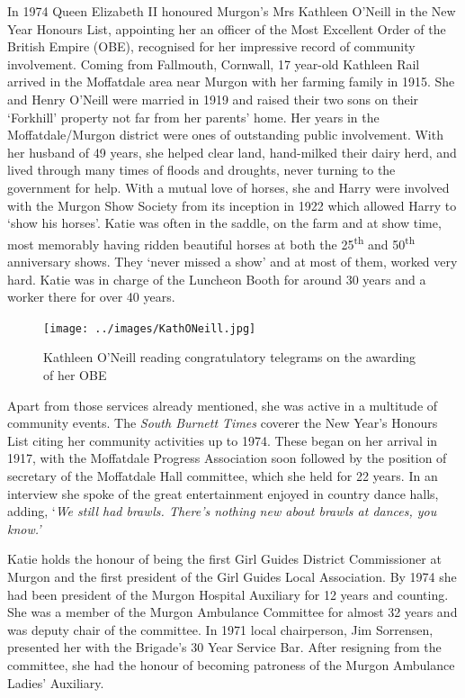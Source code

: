 In 1974 Queen Elizabeth II honoured Murgon's Mrs Kathleen O'Neill in the New Year Honours List, appointing her an officer of the Most Excellent Order of the British Empire (OBE), recognised for her impressive record of community involvement. Coming from Fallmouth, Cornwall, 17 year-old Kathleen Rail arrived in the Moffatdale area near Murgon with her farming family in 1915. She and Henry O'Neill were married in 1919 and raised their two sons on their `Forkhill' property not far from her parents' home. Her years in the Moffatdale/Murgon district were ones of outstanding public involvement. With her husband of 49 years, she helped clear land, hand-milked their dairy herd, and lived through many times of floods and droughts, never turning to the government for help. With a mutual love of horses, she and Harry were involved with the Murgon Show Society from its inception in 1922 which allowed Harry to `show his horses'. Katie was often in the saddle, on the farm and at show time, most memorably having ridden beautiful horses at both the 25\textsuperscript{th} and 50\textsuperscript{th} anniversary shows. They `never missed a show' and at most of them, worked very hard. Katie was in charge of the Luncheon Booth for around 30 years and a worker there for over 40 years.









\begin{figure}
\begin{center}
\texttt{[image: ../images/KathONeill.jpg]}
\caption{Kathleen O'Neill reading congratulatory telegrams on the awarding of her OBE}
\end{center}
\end{figure}




Apart from those services already mentioned, she was active in a multitude of community events. The \emph{South Burnett Times} coverer the New Year's Honours List citing her community activities up to 1974. These began on her arrival in 1917, with the Moffatdale Progress Association soon followed by the position of secretary of the Moffatdale Hall committee, which she held for 22 years. In an interview she spoke of the great entertainment enjoyed in country dance halls, adding, `\emph{We still had brawls. There's nothing new about brawls at dances, you know.'}



Katie holds the honour of being the first Girl Guides District Commissioner at Murgon and the first president of the Girl Guides Local Association. By 1974 she had been president of the Murgon Hospital Auxiliary for 12 years and counting. She was a member of the Murgon Ambulance Committee for almost 32 years and was deputy chair of the committee. In 1971 local chairperson, Jim Sorrensen, presented her with the Brigade's 30 Year Service Bar. After resigning from the committee, she had the honour of becoming patroness of the Murgon Ambulance Ladies' Auxiliary.



